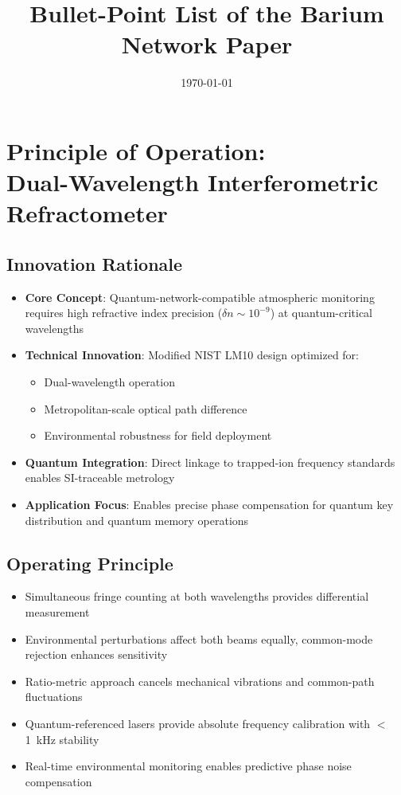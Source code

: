 \documentclass[aps,prl,reprint,groupedaddress,onecolumn,superscriptaddress]{revtex4-2}
\begin{document}
\title{Bullet-Point List of the Barium Network Paper}
\date{\today}

\maketitle

\section{Principle of Operation: \\ Dual-Wavelength Interferometric Refractometer}

\subsection{Innovation Rationale}
\begin{itemize}
    \item \textbf{Core Concept}: Quantum-network-compatible atmospheric monitoring requires high refractive index precision ($\delta n \sim 10^{-9}$) at quantum-critical wavelengths
    \item \textbf{Technical Innovation}: Modified NIST LM10 design \cite{fox1999reliable} optimized for:
    \begin{itemize}
        \item Dual-wavelength operation
        \item Metropolitan-scale optical path difference
        \item Environmental robustness for field deployment
    \end{itemize}
    \item \textbf{Quantum Integration}: Direct linkage to trapped-ion frequency standards enables SI-traceable metrology
    \item \textbf{Application Focus}: Enables precise phase compensation for quantum key distribution and quantum memory operations
\end{itemize}

\subsection{Operating Principle}
\begin{itemize}
    \item Simultaneous fringe counting at both wavelengths provides differential measurement
    \item Environmental perturbations affect both beams equally, common-mode rejection enhances sensitivity
    \item Ratio-metric approach cancels mechanical vibrations and common-path fluctuations
    \item Quantum-referenced lasers provide absolute frequency calibration with $<$\SI{1}{\kilo\hertz} stability
    \item Real-time environmental monitoring enables predictive phase noise compensation
\end{itemize}
\end{document}
